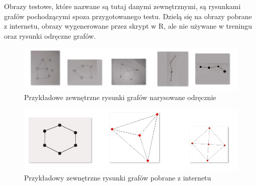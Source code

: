 Obrazy testowe, które nazwane są tutaj danymi zewnętrznymi, są rysunkami grafów pochodzącymi spoza przygotowanego testu.
Dzielą się na obrazy pobrane z internetu, obrazy wygenerowane przez skrypt w R, ale nie używane w treningu
oraz rysunki odręczne grafów.

\begin{figure}[ht]
	\centering
	\includegraphics[width=15.5cm]{resources/tests/images/ext-graphs-drawn.png}
	\caption{Przykładowe zewnętrzne rysunki grafów narysowane odręcznie}
	\label{Fig:tests-outside-1}
\end{figure}
\FloatBarrier

\begin{figure}[ht]
	\centering
	\includegraphics[width=15cm]{resources/tests/images/ext-graphs-internet.png}
	\caption{Przykładowy zewnętrzne rysunki grafów pobrane z internetu}
	\label{Fig:tests-outside-2}
\end{figure}
\FloatBarrier